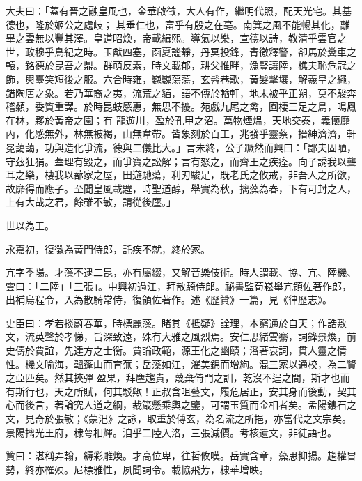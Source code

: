 \begin{pinyinscope}
 大夫曰：「蓋有晉之融皇風也，金華啟徵，大人有作，繼明代照，配天光宅。其基德也，隆於姬公之處岐；
 其垂仁也，富乎有殷之在亳。南箕之風不能暢其化，離畢之雲無以豐其澤。皇道昭煥，帝載緝熙。導氣以樂，宣德以詩，教清乎雲官之世，政穆乎鳥紀之時。玉猷四塞，函夏謐靜，丹冥投鋒，青徼釋警，卻馬於糞車之轅，銘德於昆吾之鼎。群萌反素，時文載郁，耕父推畔，漁豎讓陸，樵夫恥危冠之飾，輿臺笑短後之服。六合時雍，巍巍蕩蕩，玄髫巷歌，黃髮擊壤，解羲皇之繩，錯陶唐之象。若乃華裔之夷，流荒之貊，語不傳於輶軒，地未被乎正朔，莫不駿奔稽顙，委質重譯。於時昆蚑感惠，無思不擾。苑戲九尾之禽，囿棲三足之鳥，鳴鳳在林，夥於黃帝之園；有
 龍遊川，盈於孔甲之沼。萬物煙煴，天地交泰，義懷靡內，化感無外，林無被褐，山無韋帶。皆象刻於百工，兆發乎靈蔡，搢紳濟濟，軒冕藹藹，功與造化爭流，德與二儀比大。」言未終，公子蹶然而興曰：「鄙夫固陋，守茲狂狷。蓋理有毀之，而爭寶之訟解；言有怒之，而齊王之疾痊。向子誘我以聾耳之樂，棲我以蔀家之屋，田遊馳蕩，利刃駿足，既老氏之攸戒，非吾人之所欲，故靡得而應子。至聞皇風載韙，時聖道醇，舉實為秋，摛藻為春，下有可封之人，上有大哉之君，餘雖不敏，請從後塵。」



 世以為工。



 永嘉初，復徵為黃門侍郎，託疾不就，終於家。



 亢字季陽。才藻不逮二昆，亦有屬綴，又解音樂伎術。時人謂載、協、亢、陸機、雲曰：「二陸」「三張」。中興初過江，拜散騎侍郎。祕書監荀崧舉亢領佐著作郎，出補烏程令，入為散騎常侍，復領佐著作。述《歷贊》一篇，見《律歷志》。



 史臣曰：孝若掞蔚春華，時標麗藻。睹其《抵疑》詮理，本窮通於自天；作誥敷文，流英聲於孝悌，旨深致遠，殊有大雅之風烈焉。安仁思緒雲騫，詞鋒景煥，前史儔於賈誼，先達方之士衡。賈論政範，源王化之幽賾；潘著哀詞，貫人靈之情性。機文喻海，韞蓬山而育蕪；岳藻如江，濯美錦而增絢。混三家以通校，為二賢之亞匹矣。然其挾彈
 盈果，拜塵趨貴，蔑棄倚門之訓，乾沒不逞之間，斯才也而有斯行也，天之所賦，何其駁歟！正叔含咀藝文，履危居正，安其身而後動，契其心而後言，著論究人道之綱，裁箴懸乘輿之鑒，可謂玉質而金相者矣。孟陽鏤石之文，見奇於張敏；《蒙汜》之詠，取重於傅玄，為名流之所挹，亦當代之文宗矣。景陽摛光王府，棣萼相輝。洎乎二陸入洛，三張減價。考核遺文，非徒語也。



 贊曰：湛稱弄翰，縟彩雕煥。才高位卑，往哲攸嘆。岳實含章，藻思抑揚。趨權冒勢，終亦罹殃。尼標雅性，夙聞詞令。載協飛芳，棣華增映。



\end{pinyinscope}